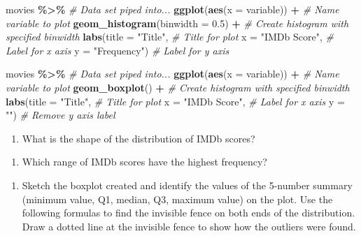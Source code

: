 \documentclass[
]{report}
\newenvironment{Shaded}{\begin{snugshade}}{\end{snugshade}}
\newcommand{\AttributeTok}[1]{\textcolor[rgb]{0.13,0.29,0.53}{#1}}
\newcommand{\CommentTok}[1]{\textcolor[rgb]{0.56,0.35,0.01}{\textit{#1}}}
\newcommand{\FloatTok}[1]{\textcolor[rgb]{0.00,0.00,0.81}{#1}}
\newcommand{\FunctionTok}[1]{\textcolor[rgb]{0.13,0.29,0.53}{\textbf{#1}}}
\newcommand{\NormalTok}[1]{#1}
\newcommand{\SpecialCharTok}[1]{\textcolor[rgb]{0.81,0.36,0.00}{\textbf{#1}}}
\newcommand{\StringTok}[1]{\textcolor[rgb]{0.31,0.60,0.02}{#1}}
\providecommand{\tightlist}{%
  \setlength{\itemsep}{0pt}\setlength{\parskip}{0pt}}
\begin{document}
\begin{Shaded}
\begin{Highlighting}[]
\NormalTok{movies }\SpecialCharTok{\%\textgreater{}\%} \CommentTok{\# Data set piped into...}
\FunctionTok{ggplot}\NormalTok{(}\FunctionTok{aes}\NormalTok{(}\AttributeTok{x =}\NormalTok{ variable)) }\SpecialCharTok{+}   \CommentTok{\# Name variable to plot}
  \FunctionTok{geom\_histogram}\NormalTok{(}\AttributeTok{binwidth =} \FloatTok{0.5}\NormalTok{) }\SpecialCharTok{+}  \CommentTok{\# Create histogram with specified binwidth}
  \FunctionTok{labs}\NormalTok{(}\AttributeTok{title =} \StringTok{"Title"}\NormalTok{, }\CommentTok{\# Title for plot}
       \AttributeTok{x =} \StringTok{"IMDb Score"}\NormalTok{, }\CommentTok{\# Label for x axis}
       \AttributeTok{y =} \StringTok{"Frequency"}\NormalTok{) }\CommentTok{\# Label for y axis}

\NormalTok{movies }\SpecialCharTok{\%\textgreater{}\%} \CommentTok{\# Data set piped into...}
\FunctionTok{ggplot}\NormalTok{(}\FunctionTok{aes}\NormalTok{(}\AttributeTok{x =}\NormalTok{ variable)) }\SpecialCharTok{+}   \CommentTok{\# Name variable to plot}
  \FunctionTok{geom\_boxplot}\NormalTok{() }\SpecialCharTok{+}  \CommentTok{\# Create histogram with specified binwidth}
  \FunctionTok{labs}\NormalTok{(}\AttributeTok{title =} \StringTok{"Title"}\NormalTok{, }\CommentTok{\# Title for plot}
       \AttributeTok{x =} \StringTok{"IMDb Score"}\NormalTok{, }\CommentTok{\# Label for x axis}
       \AttributeTok{y =} \StringTok{""}\NormalTok{) }\CommentTok{\# Remove y axis label}
\end{Highlighting}
\end{Shaded}

\begin{enumerate}
\def\labelenumi{\arabic{enumi}.}
\setcounter{enumi}{3}
\tightlist
\item
  What is the shape of the distribution of IMDb scores?
\end{enumerate}

\vspace{0.2in}

\begin{enumerate}
\def\labelenumi{\arabic{enumi}.}
\setcounter{enumi}{4}
\tightlist
\item
  Which range of IMDb scores have the highest frequency?
\end{enumerate}

\vspace{0.2in}

\begin{enumerate}
\def\labelenumi{\arabic{enumi}.}
\setcounter{enumi}{5}
\tightlist
\item
  Sketch the boxplot created and identify the values of the 5-number summary (minimum value, Q1, median, Q3, maximum value) on the plot. Use the following formulas to find the invisible fence on both ends of the distribution. Draw a dotted line at the invisible fence to show how the outliers were found.
\end{enumerate}
\end{document}
